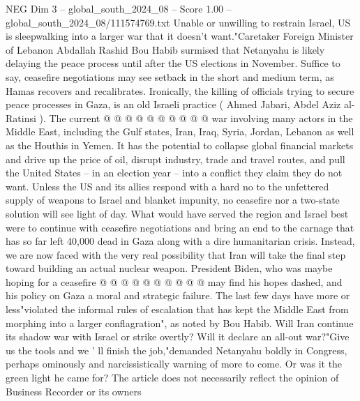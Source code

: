 \begin{textsample}{NEG Dim 3 – global\_south\_2024\_08 – Score 1.00 – global\_south\_2024\_08/111574769.txt}
Unable or unwilling to restrain Israel, US is sleepwalking into a larger war that it doesn't want."Caretaker Foreign Minister of Lebanon Abdallah Rashid Bou Habib surmised that Netanyahu is likely delaying the peace process until after the US elections in November.
Suffice to say, ceasefire negotiations may see setback in the short and medium term, as Hamas recovers and recalibrates.
Ironically, the killing of officials trying to secure peace processes in Gaza, is an old Israeli practice ( Ahmed Jabari, Abdel Aziz al-Ratinsi ).
The current @ @ @ @ @ @ @ @ @ @ war involving many actors in the Middle East, including the Gulf states, Iran, Iraq, Syria, Jordan, Lebanon as well as the Houthis in Yemen.
It has the potential to collapse global financial markets and drive up the price of oil, disrupt industry, trade and travel routes, and pull the United States -- in an election year -- into a conflict they claim they do not want.
Unless the US and its allies respond with a hard no to the unfettered supply of weapons to Israel and blanket impunity, no ceasefire nor a two-state solution will see light of day.
What would have served the region and Israel best were to continue with ceasefire negotiations and bring an end to the carnage that has so far left 40,000 dead in Gaza along with a dire humanitarian crisis.
Instead, we are now faced with the very real possibility that Iran will take the final step toward building an actual nuclear weapon.
President Biden, who was maybe hoping for a ceasefire @ @ @ @ @ @ @ @ @ @ may find his hopes dashed, and his policy on Gaza a moral and strategic failure.
The last few days have more or less"violated the informal rules of escalation that has kept the Middle East from morphing into a larger conflagration", as noted by Bou Habib.
Will Iran continue its shadow war with Israel or strike overtly?
Will it declare an all-out war?"Give us the tools and we ' ll finish the job,"demanded Netanyahu boldly in Congress, perhaps ominously and narcissistically warning of more to come.
Or was it the green light he came for?
The article does not necessarily reflect the opinion of Business Recorder or its owners

\end{textsample}
